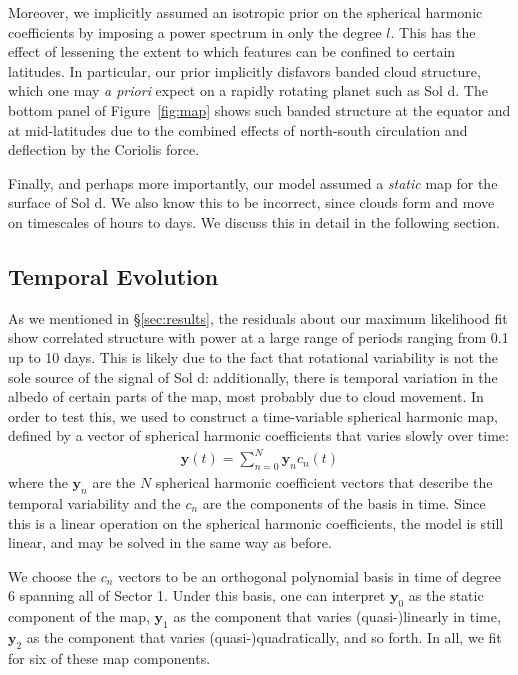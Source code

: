 \documentclass[modern]{aastex62}
\begin{document}
Moreover, we implicitly assumed an isotropic prior on the spherical harmonic
coefficients by imposing a power spectrum in only the degree $l$. This has the
effect of lessening the extent to which features can be confined to certain
latitudes. In particular, our prior implicitly disfavors banded cloud structure,
which one may \emph{a priori} expect on a rapidly rotating planet such as 
Sol d. The bottom panel of Figure~\ref{fig:map} shows such banded structure
at the equator and at mid-latitudes due to the combined effects of 
north-south circulation and deflection by the Coriolis force.

Finally, and perhaps more importantly, our model assumed a \emph{static}
map for the surface of Sol d. We also know this to be incorrect, since
clouds form and move on timescales of hours to days. We discuss this in
detail in the following section.

\subsection{Temporal Evolution}
\label{sec:temporal}

As we mentioned in \S\ref{sec:results}, the residuals about our maximum
likelihood fit show correlated structure with power at a large range
of periods ranging from 0.1 up to 10 days. This is likely due to 
the fact that rotational variability is not the sole source of the
signal of Sol d: additionally, there is temporal variation in the 
albedo of certain parts of the map, most probably due to cloud movement.
In order to test this, we used \starry to construct a time-variable
spherical harmonic map, defined by a vector of spherical harmonic coefficients
that varies slowly over time:
%
\begin{align}
    \mathbf{y}(t) = \sum_{n=0}^N \mathbf{y}_n c_n(t)
\end{align}
%
where the $\mathbf{y}_n$ are the $N$ spherical harmonic coefficient
vectors that describe the temporal variability and the $c_n$ are the components
of the basis in time. Since this is a linear operation on the spherical
harmonic coefficients, the \starry model is still linear, and may be
solved in the same way as before. 

We choose the $c_n$ vectors to be an orthogonal polynomial basis in time of 
degree 6 spanning all of Sector 1. Under this basis, one can 
interpret
$\mathbf{y}_0$ as the static component of the map, $\mathbf{y}_1$ as the
component that varies (quasi-)linearly in time, $\mathbf{y}_2$ as the component
that varies (quasi-)quadratically, and so forth. In all, we fit for six
of these map components.
\end{document}
